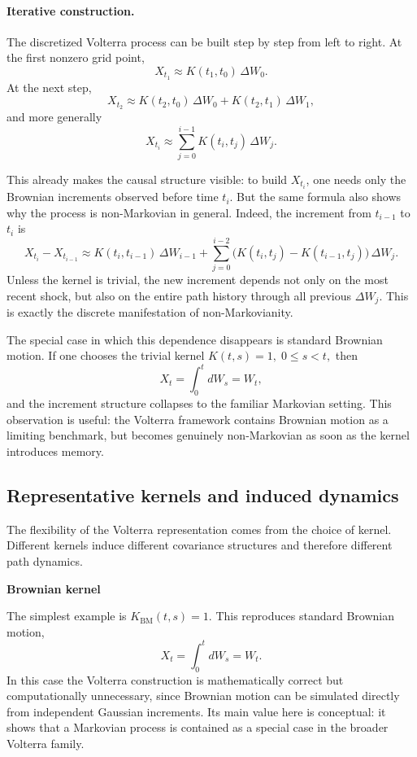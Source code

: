 \paragraph{Iterative construction.}

The discretized Volterra process can be built step by step from left to right. At the first nonzero grid point,
\[
X_{t_1}\approx K(t_1,t_0)\,\Delta W_0.
\]
At the next step,
\[
X_{t_2}\approx K(t_2,t_0)\,\Delta W_0 + K(t_2,t_1)\,\Delta W_1,
\]
and more generally
\[
X_{t_i}\approx \sum_{j=0}^{i-1} K(t_i,t_j)\,\Delta W_j.
\]

This already makes the causal structure visible: to build \(X_{t_i}\), one needs only the Brownian increments observed before time \(t_i\). But the same formula also shows why the process is non-Markovian in general. Indeed, the increment from \(t_{i-1}\) to \(t_i\) is
\[
X_{t_i}-X_{t_{i-1}}
\approx
K(t_i,t_{i-1})\,\Delta W_{i-1}
+
\sum_{j=0}^{i-2}
\bigl(K(t_i,t_j)-K(t_{i-1},t_j)\bigr)\,\Delta W_j.
\]
Unless the kernel is trivial, the new increment depends not only on the most recent shock, but also on the entire path history through all previous \(\Delta W_j\). This is exactly the discrete manifestation of non-Markovianity.

The special case in which this dependence disappears is standard Brownian motion. If one chooses the trivial kernel
\(
K(t,s)=1,
\; 0\le s<t,
\)
then
\[
X_t=\int_0^t dW_s = W_t,
\]
and the increment structure collapses to the familiar Markovian setting. This observation is useful: the Volterra framework contains Brownian motion as a limiting benchmark, but becomes genuinely non-Markovian as soon as the kernel introduces memory.
\subsection{Representative kernels and induced dynamics}

The flexibility of the Volterra representation comes from the choice of kernel. Different kernels induce different covariance structures and therefore different path dynamics.

\textbf{Brownian kernel}

The simplest example is
\(
K_{\mathrm{BM}}(t,s)=1.
\)
This reproduces standard Brownian motion,
\[
X_t=\int_0^t dW_s=W_t.
\]
In this case the Volterra construction is mathematically correct but computationally unnecessary, since Brownian motion can be simulated directly from independent Gaussian increments. Its main value here is conceptual: it shows that a Markovian process is contained as a special case in the broader Volterra family.

